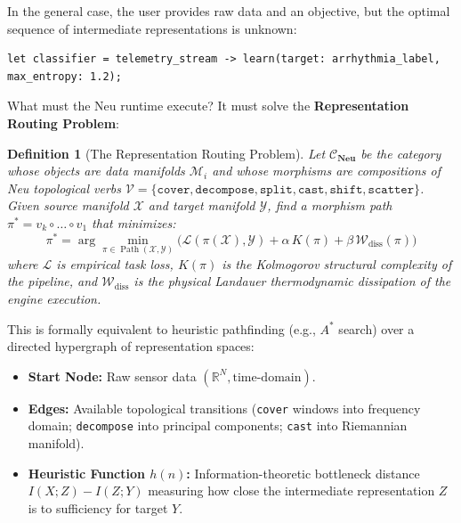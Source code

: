 \documentclass[11pt]{article}
\newtheorem{definition}{Definition}
\begin{document}
In the general case, the user provides raw data and an objective, but the optimal sequence of intermediate representations is unknown:
\begin{lstlisting}[language=neu]
let classifier = telemetry_stream -> learn(target: arrhythmia_label, max_entropy: 1.2);
\end{lstlisting}

What must the Neu runtime execute? It must solve the \textbf{Representation Routing Problem}:

\begin{definition}[The Representation Routing Problem]
Let $\mathcal{C}_{\mathbf{Neu}}$ be the category whose objects are data manifolds $\mathcal{M}_i$ and whose morphisms are compositions of Neu topological verbs $\mathcal{V} = \{\texttt{cover}, \texttt{decompose}, \texttt{split}, \texttt{cast}, \texttt{shift}, \texttt{scatter}\}$. Given source manifold $\mathcal{X}$ and target manifold $\mathcal{Y}$, find a morphism path $\pi^* = v_k \circ \dots \circ v_1$ that minimizes:
$$\pi^* = \arg\min_{\pi \in \operatorname{Path}(\mathcal{X}, \mathcal{Y})} \Big( \mathcal{L}(\pi(\mathcal{X}), \mathcal{Y}) + \alpha \, K(\pi) + \beta \, \mathcal{W}_{\text{diss}}(\pi) \Big)$$
where $\mathcal{L}$ is empirical task loss, $K(\pi)$ is the Kolmogorov structural complexity of the pipeline, and $\mathcal{W}_{\text{diss}}$ is the physical Landauer thermodynamic dissipation of the engine execution.
\end{definition}

This is formally equivalent to heuristic pathfinding (e.g., $A^*$ search) over a directed hypergraph of representation spaces:
\begin{itemize}
    \item \textbf{Start Node:} Raw sensor data $(\mathbb{R}^N, \text{time-domain})$.
    \item \textbf{Edges:} Available topological transitions (\texttt{cover} windows into frequency domain; \texttt{decompose} into principal components; \texttt{cast} into Riemannian manifold).
    \item \textbf{Heuristic Function $h(n)$:} Information-theoretic bottleneck distance $I(X; Z) - I(Z; Y)$ measuring how close the intermediate representation $Z$ is to sufficiency for target $Y$.
\end{itemize}
\end{document}
